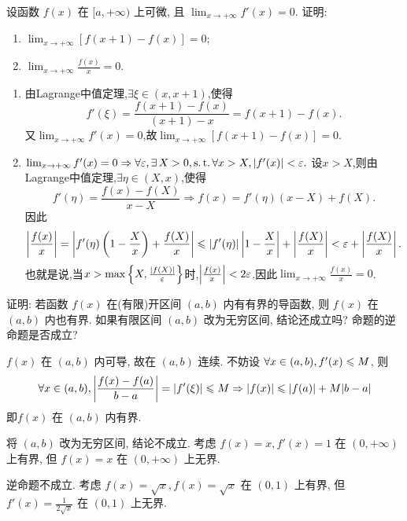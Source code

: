 \begin{exercise}[3.3.10]
    设函数 $f(x)$ 在 $[a, +\infty)$ 上可微, 且 $\lim_{x \to +\infty} f'(x) = 0$. 证明:
    \begin{enumerate}
        \item $\lim_{x \to +\infty} [f(x+1)-f(x)] = 0$;
        \item $\lim_{x \to +\infty} \frac{f(x)}{x} = 0$.
    \end{enumerate}
\end{exercise}

\begin{solution}
    \begin{enumerate}
        \item 由Lagrange中值定理,$\exists \xi \in (x,x+1)$,使得
              $$
                  f'(\xi) = \frac{f(x+1)-f(x)}{(x+1)-x} = f(x+1)-f(x).
              $$
              又$\lim_{x \to +\infty} f'(x) = 0$,故$\lim_{x \to +\infty} [f(x+1)-f(x)] = 0$.
        \item $\lim_{x \to +\infty} f'(x) = 0 \Rightarrow \forall \ve, \exists X > 0 , \st \forall x > X, |f'(x)| < \ve.$
                设$x > X$,则由Lagrange中值定理,$\exists \eta \in (X,x)$,使得
              $$
                  f'(\eta) = \frac{f(x)-f(X)}{x-X} \Rightarrow f(x) = f'(\eta)(x-X) + f(X).
                $$
                因此
                $$
                    \left|\frac{f(x)}{x}\right| = \left|f'(\eta)\left(1-\frac{X}{x}\right) + \frac{f(X)}{x}\right| \leqslant |f'(\eta)|\left|1-\frac{X}{x}\right| + \left|\frac{f(X)}{x}\right| < \varepsilon + \left| \frac{f(X)}{x}\right|.
                $$
                也就是说,当$x > \max\left\{X, \frac{|f(X)|}{\varepsilon}\right\}$时,$\left|\frac{f(x)}{x}\right| < 2\varepsilon$.因此$\lim_{x \to +\infty} \frac{f(x)}{x} = 0$.
    \end{enumerate}
\end{solution}

\begin{exercise}[3.3.11]
    证明: 若函数 $f(x)$ 在(有限)开区间 $(a,b)$ 内有有界的导函数, 则 $f(x)$ 在 $(a,b)$ 内也有界. 如果有限区间 $(a,b)$ 改为无穷区间, 结论还成立吗? 命题的逆命题是否成立?
\end{exercise}

\begin{solution}
    $f(x)$ 在 $(a, b)$ 内可导, 故在 $(a, b)$ 连续.
不妨设 $\forall x \in (a, b), f'(x) \leqslant M$, 则
$$ \forall x \in (a, b), \left|\frac{f(x) - f(a)}{b-a}\right| = |f'(\xi)| \leqslant M \Rightarrow |f(x)| \leqslant |f(a)| + M|b-a| $$
即$ f(x)$ 在 $(a, b)$ 内有界.

将 $(a, b)$ 改为无穷区间, 结论不成立. 考虑 $f(x) = x, f'(x) = 1$ 在 $(0, +\infty)$ 上有界, 但 $f(x) = x$ 在 $(0, +\infty)$ 上无界.

逆命题不成立. 考虑 $f(x) = \sqrt{x}, f(x) = \sqrt{x}$ 在 $(0, 1)$ 上有界, 但 $f'(x) = \frac{1}{2\sqrt{x}}$ 在 $(0, 1)$ 上无界.
\end{solution}


